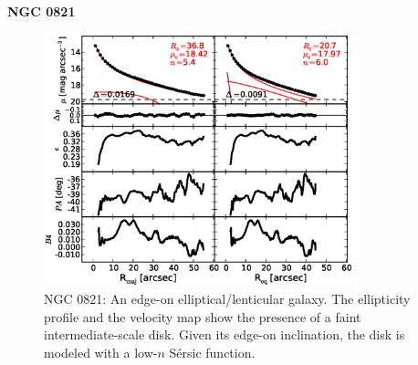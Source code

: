 \documentclass[preprint2]{emulateapj}
\newcommand{\fitfigurewidth}{0.8\textwidth}
\begin{document}
  \clearpage\newpage\noindent

  {\bf NGC 0821 \\}

  \begin{figure}[h]
  \begin{center}
  \includegraphics[width=\fitfigurewidth]{images/n0821_1Dfit.eps}
  \caption{NGC 0821: 
  An edge-on elliptical/lenticular galaxy. 
  The ellipticity profile and the velocity map show the presence of a faint intermediate-scale disk. 
  Given its edge-on inclination, the disk is modeled with a low-$n$ S\'ersic function.   
  }
  \end{center}
  \end{figure}
  
\end{document}
